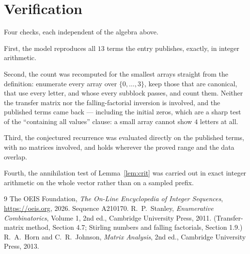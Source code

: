 \documentclass[11pt,a4paper]{article}
\theoremstyle{plain}
\theoremstyle{definition}
\begin{document}
\section{Verification}

Four checks, each independent of the algebra above.

First, the model reproduces all $13$ terms the entry publishes, exactly, in integer
arithmetic.

Second, the count was recomputed for the smallest arrays straight from the definition:
enumerate every array over $\{0,\dots,3\}$, keep those that are canonical, that use every
letter, and whose every subblock passes, and count them. Neither the transfer matrix nor the
falling-factorial inversion is involved, and the published terms came back --- including the
initial zeros, which are a sharp test of the ``containing all values'' clause: a small array
cannot show $4$ letters at all.

Third, the conjectured recurrence was evaluated directly on the published terms, with no
matrices involved, and holds wherever the proved range and the data overlap.

Fourth, the annihilation test of Lemma~\ref{lem:crit} was carried out in exact integer
arithmetic on the whole vector rather than on a sampled prefix.

\begin{thebibliography}{9}
 The OEIS Foundation, \emph{The On-Line Encyclopedia of Integer
Sequences}, \url{https://oeis.org}, 2026. Sequence A210170.
 R.~P.~Stanley, \emph{Enumerative Combinatorics}, Volume 1, 2nd ed.,
Cambridge University Press, 2011. (Transfer-matrix method, Section 4.7; Stirling numbers and
falling factorials, Section 1.9.)
 R.~A.~Horn and C.~R.~Johnson, \emph{Matrix Analysis}, 2nd ed., Cambridge
University Press, 2013.
\end{thebibliography}
\end{document}

